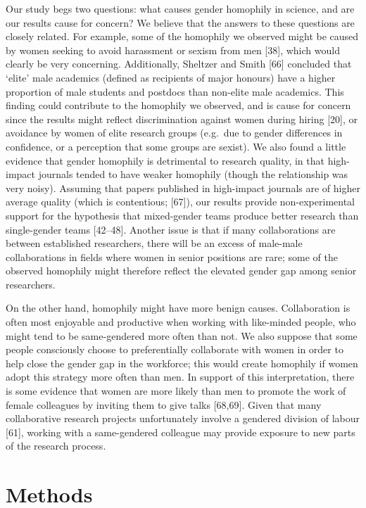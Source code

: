 \documentclass[12pt,]{article}
\begin{document}
Our study begs two questions: what causes gender homophily in science,
and are our results cause for concern? We believe that the answers to
these questions are closely related. For example, some of the homophily
we observed might be caused by women seeking to avoid harassment or
sexism from men {[}38{]}, which would clearly be very concerning.
Additionally, Sheltzer and Smith {[}66{]} concluded that `elite' male
academics (defined as recipients of major honours) have a higher
proportion of male students and postdocs than non-elite male academics.
This finding could contribute to the homophily we observed, and is cause
for concern since the results might reflect discrimination against women
during hiring {[}20{]}, or avoidance by women of elite research groups
(e.g.~due to gender differences in confidence, or a perception that some
groups are sexist). We also found a little evidence that gender
homophily is detrimental to research quality, in that high-impact
journals tended to have weaker homophily (though the relationship was
very noisy). Assuming that papers published in high-impact journals are
of higher average quality (which is contentious; {[}67{]}), our results
provide non-experimental support for the hypothesis that mixed-gender
teams produce better research than single-gender teams {[}42--48{]}.
Another issue is that if many collaborations are between established
researchers, there will be an excess of male-male collaborations in
fields where women in senior positions are rare; some of the observed
homophily might therefore reflect the elevated gender gap among senior
researchers.

On the other hand, homophily might have more benign causes.
Collaboration is often most enjoyable and productive when working with
like-minded people, who might tend to be same-gendered more often than
not. We also suppose that some people consciously choose to
preferentially collaborate with women in order to help close the gender
gap in the workforce; this would create homophily if women adopt this
strategy more often than men. In support of this interpretation, there
is some evidence that women are more likely than men to promote the work
of female colleagues by inviting them to give talks {[}68,69{]}. Given
that many collaborative research projects unfortunately involve a
gendered division of labour {[}61{]}, working with a same-gendered
colleague may provide exposure to new parts of the research process.

\hypertarget{methods}{%
\section{Methods}\label{methods}}
\end{document}
